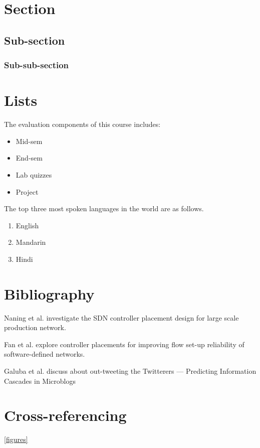 \documentclass{article}
\begin{document}
\section{Section}
\subsection{Sub-section}
\blindtext
\subsubsection{Sub-sub-section}
\blindtext

\section{Lists}
The evaluation components of this course includes:

\begin{itemize}
\item Mid-sem
\item End-sem
\item Lab quizzes
\item Project
\end{itemize}

The top three most spoken languages in the world are as follows.

\begin{enumerate}
\item English
\item Mandarin
\item Hindi
\end{enumerate}

\section{Bibliography}
Naning et al. \cite{7811452} investigate the SDN controller placement design for large scale production network.

Fan et al. \cite{fan2020controller} explore controller placements for improving flow set-up reliability of software-defined networks.

Galuba et al. \cite{galuba2010outtweeting} discuss about out-tweeting the Twitterers — Predicting Information Cascades in Microblogs


\section{Cross-referencing}
\ref{figures}

 

\end{document}
